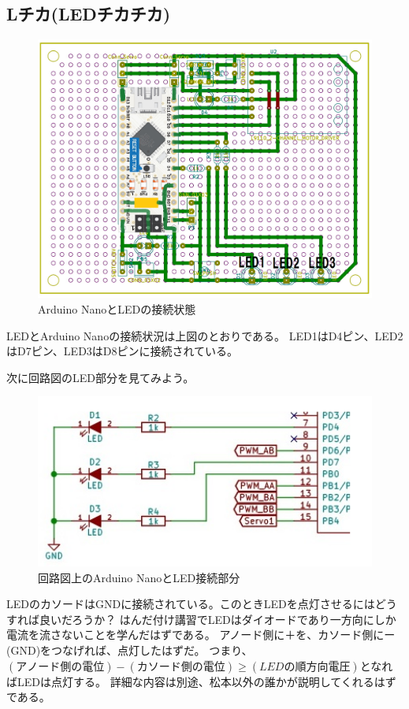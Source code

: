 \documentclass[uplatex]{jsarticle}
\begin{document}
\subsection{Lチカ(LEDチカチカ)}
\begin{figure}[htbp]
    \centering
    \includegraphics[width=15cm]{l_chika_1.png}
    \caption{Arduino NanoとLEDの接続状態}
\end{figure}
LEDとArduino Nanoの接続状況は上図のとおりである。
LED1はD4ピン、LED2はD7ピン、LED3はD8ピンに接続されている。

次に回路図のLED部分を見てみよう。
\begin{figure}[htbp]
    \centering
    \includegraphics[width=15cm]{l_chika_2.png}
    \caption{回路図上のArduino NanoとLED接続部分}
\end{figure}
LEDのカソードはGNDに接続されている。このときLEDを点灯させるにはどうすれば良いだろうか？
はんだ付け講習でLEDはダイオードであり一方向にしか電流を流さないことを学んだはずである。
アノード側に＋を、カソード側にー(GND)をつなげれば、点灯したはずだ。
つまり、$(アノード側の電位)-(カソード側の電位)\geq(LEDの順方向電圧)$となればLEDは点灯する。
詳細な内容は別途、松本以外の誰かが説明してくれるはずである。
\end{document}
